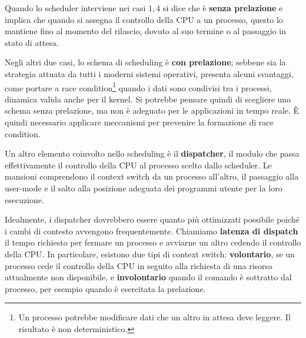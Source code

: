 \noindent Quando lo scheduler interviene nei casi $1,4$ si dice che è \textbf{senza prelazione} e implica che quando si assegna il controllo della CPU
a un processo, questo lo mantiene fino al momento del rilascio, dovuto al suo termine o al passaggio in stato di attesa.\par
Negli altri due casi, lo schema di scheduling è \textbf{con prelazione}; sebbene sia la strategia attuata da tutti i moderni sistemi operativi, presenta
alcuni svantaggi, come portare a race condition\footnote{Un processo potrebbe modificare dati che un altro in attesa deve leggere. Il risultato è 
non deterministico.} quando i dati sono condivisi tra i processi, dinamica valida anche per il kernel. Si potrebbe pensare quindi di scegliere uno
schema senza prelazione, ma non è adeguato per le applicazioni in tempo reale. È quindi necessario applicare meccanismi per prevenire la formazione di
race condition.\par
Un altro elemento coinvolto nello scheduling è il \textbf{dispatcher}, il modulo che passa effettivamente il controllo della CPU al processo
scelto dallo scheduler. Le mansioni comprendono il context switch da un processo all'altro, il passaggio alla user-mode e il salto alla posizione
adeguata dei programmi utente per la loro esecuzione.\par
Idealmente, i dispatcher dovrebbero essere quanto più ottimizzati possibile poiché i cambi di contesto avvengono frequentemente. Chiamiamo
\textbf{latenza di dispatch} il tempo richiesto per fermare un processo e avviarne un altro cedendo il controllo della CPU. In particolare, esistono
due tipi di context switch: \textbf{volontario}, se un processo cede il controllo della CPU in seguito alla richiesta di una risorsa attualmente non
disponibile, e \textbf{involontario} quando il comando è sottratto dal processo, per esempio quando è esercitata la prelazione.\newline

